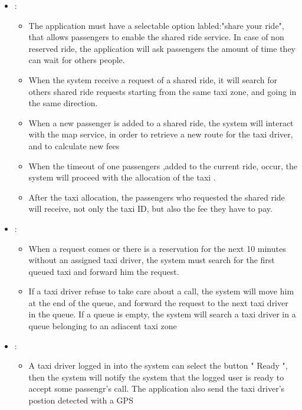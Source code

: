 \begin {itemize}
\begin{itemize}
	\end{itemize}
\item [G4]:
	\begin{itemize}
	\item The application must have a selectable option labled:"share your ride", that allows passengers to enable 
	the shared ride service. In case of non reserved ride, the application will ask passengers the amount of time 
	they can wait for others people.
	\item When the system receive a request of a shared ride, it will search for others shared ride requests starting 
	from the same taxi zone, and going in the same direction. 
	\item When a new passenger is added to a shared ride, the system will interact with the map service, in order to 
	retrieve a new route for the taxi driver, and to calculate new fees
	\item When the timeout of one passengers ,added to the current ride, occur, the system will proceed with the allocation of the taxi .
	\item After the taxi allocation, the passengers who requested the shared ride will receive, not only the taxi ID, 
	but also the fee they have to pay.
	\end{itemize}
\item[G5]:
	\begin{itemize}
	\item When a request comes or there is a reservation for the next 10 minutes without an assigned taxi driver, the 
	system must search for the first queued taxi and forward him the request.
	\item If a taxi driver refuse to take care about a call, the system will move him at the end of the queue, and 
	forward the request to the next taxi driver in the queue. If a queue is empty, the system will search a taxi 
	driver in a queue belonging to an adiacent taxi zone 
	\end{itemize}
\item [G6]:
	\begin{itemize}
	\item A taxi driver logged in into the system can select the button " Ready ", then the system will notify the system 
	that the logged user is ready to accept some passengr's call. The application also send the taxi driver's postion detected with a GPS

\end{itemize}
\end{itemize}
